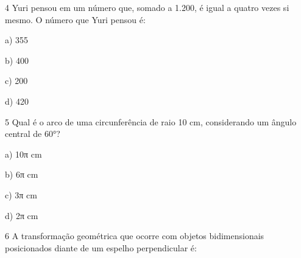 \num{4} Yuri pensou em um número que, somado a 1.200, é igual a quatro vezes
si mesmo. O número que Yuri pensou é:

a) 355

b) 400

c) 200

d) 420



\num{5} Qual é o arco de uma circunferência de raio 10 cm, considerando um
ângulo central de 60°?

a) 10π cm

b) 6π cm

c) 3π cm

d) 2π cm




\num{6} A transformação geométrica que ocorre com objetos bidimensionais
posicionados diante de um espelho perpendicular é:

